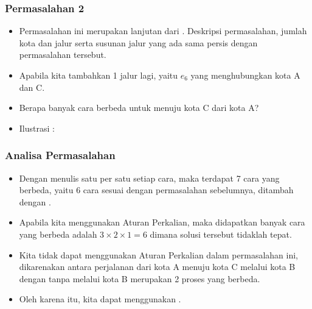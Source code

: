 \begin{frame}
\frametitle{Permasalahan 2}
\begin{itemize}
  \item Permasalahan ini merupakan lanjutan dari . Deskripsi permasalahan, jumlah kota dan jalur serta susunan jalur yang ada sama persis dengan permasalahan tersebut.
  \item Apabila kita tambahkan 1 jalur lagi, yaitu $e_{6}$ yang menghubungkan kota A dan C.
  \item Berapa banyak cara berbeda untuk menuju kota C dari kota A?
  \item Ilustrasi :
  \newline
\end{itemize}
\end{frame}

\begin{frame}
\frametitle{Analisa Permasalahan}
\begin{itemize}
  \item Dengan menulis satu per satu setiap cara, maka terdapat 7 cara yang berbeda, yaitu 6 cara sesuai dengan permasalahan sebelumnya, ditambah dengan .
  \item Apabila kita menggunakan Aturan Perkalian, maka didapatkan banyak cara yang berbeda adalah $3 \times 2 \times 1 = 6$ dimana solusi tersebut tidaklah tepat.
  \item Kita tidak dapat menggunakan Aturan Perkalian dalam permasalahan ini, dikarenakan antara perjalanan dari kota A menuju kota C melalui kota B dengan tanpa melalui kota B merupakan 2 proses yang berbeda.
  \item Oleh karena itu, kita dapat menggunakan .
\end{itemize}
\end{frame}

